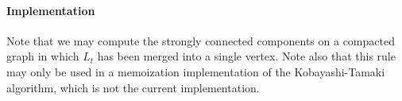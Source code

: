 \documentclass{article}
\begin{document}
\paragraph{Implementation} Note that we may compute the strongly connected
components on a compacted graph in which $L_t$ has been merged into a single
vertex. Note also that this rule may only be used in a memoization implementation
of the Kobayashi-Tamaki algorithm, which is not the current implementation.
\end{document}
